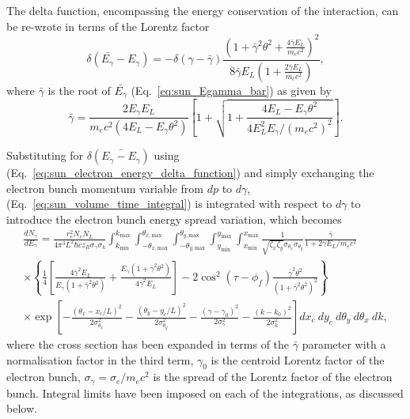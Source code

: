 \documentclass[../main.tex]{subfiles}
\begin{document}
The delta function, encompassing the energy conservation of the interaction, can be re-wrote in terms of the Lorentz factor
\begin{equation}
\delta\left(\bar{E_{\gamma}}-E_{\gamma}\right) = -\delta\left(\gamma-\bar{\gamma}\right)\frac{\left(1+\bar{\gamma}^{2}\theta^{2}+\frac{4\bar{\gamma}E_{L}}{m_{e}c^{2}}\right)^{2}}{8\bar{\gamma}E_{L}\left(1+\frac{2\bar{\gamma}E_{L}}{m_{e}c^{2}}\right)},
\label{eq:sun_electron_energy_delta_function}    
\end{equation}
where $\bar{\gamma}$ is the root of $\bar{E_{\gamma}}$ (Eq.~\ref{eq:sun_Egamma_bar}) as given by
\begin{equation}
\bar{\gamma} = \frac{2E_{\gamma}E_{L}}{m_{e}c^{2}\left(4E_{L}-E_{\gamma}\theta^{2}\right)}\left[1+\sqrt{1+\frac{4E_{L}-E_{\gamma}\theta^{2}}{4E_{L}^{2}E_{\gamma}/\left(m_{e}c^{2}\right)^{2}}}\right].    
\end{equation}

Substituting for $\delta\left(\bar{E_{\gamma}-E_{\gamma}}\right)$ using (Eq.~\ref{eq:sun_electron_energy_delta_function}) and simply exchanging the electron bunch momentum variable from $dp$ to $d\gamma$, (Eq.~\ref{eq:sun_volume_time_integral}) is integrated with respect to $d\gamma$ to introduce the electron bunch energy spread variation, which becomes
\begin{multline}
\frac{dN_{\gamma}}{dE_{\gamma}} = \frac{r_{e}^{2}N_{e}N_{L}}{4\pi^{3}L^{2}\hbar c z_{R}\sigma_{\gamma}\sigma_{k}}\int_{k_{\mathrm{min}}}^{k_{\mathrm{max}}}\int_{-\theta_{x,\mathrm{max}}}^{\theta_{x,\mathrm{max}}}\int_{-\theta_{y,\mathrm{max}}}^{\theta_{y,\mathrm{max}}}\int_{y_{\mathrm{min}}}^{y_{\mathrm{max}}}\int_{x_{\mathrm{min}}}^{x_{\mathrm{max}}}\frac{1}{\sqrt{\zeta_{x}\zeta_{y}}\sigma_{\theta_{x}}\sigma_{\theta_{y}}}\frac{\bar{\gamma}}{1+2\gamma E_{L}/m_{e}c^{2}} \\
\times\left\{\frac{1}{4}\left[\frac{4\bar{\gamma}^{2}E_{L}}{E_{\gamma}\left(1+\bar{\gamma}^{2}\theta^{2}\right)}+\frac{E_{\gamma}\left(1+\bar{\gamma}^{2}\theta^{2}\right)}{4\bar{\gamma}^{2}E_{L}}\right]-2\cos^{2}\left(\tau-\phi_{f}\right)\frac{\bar{\gamma}^{2}\theta^{2}}{\left(1+\bar{\gamma}^{2}\theta^{2}\right)^{2}}\right\} \\
\times\exp{\left[-\frac{\left(\theta_{x}-x_{c}/L\right)^{2}}{2\sigma_{\theta_{x}}^{2}}-\frac{\left(\theta_{y}-y_{c}/L\right)^{2}}{2\sigma_{\theta_{y}}^{2}}-\frac{\left(\gamma-\gamma_{0}\right)^{2}}{2\sigma_{\gamma}^{2}}-\frac{\left(k-k_{0}\right)^{2}}{2\sigma_{k}^{2}}\right]}dx_{c}~dy_{c}~d\theta_{y}~d\theta_{x}~dk,
\label{eq:ICARUS_equation}
\end{multline}
where the cross section has been expanded in terms of the $\bar{\gamma}$ parameter with a normalisation factor in the third term, $\gamma_{0}$ is the centroid Lorentz factor of the electron bunch, $\sigma_{\gamma} = \sigma_{e}/m_{e}c^{2}$ is the spread of the Lorentz factor of the electron bunch. Integral limits have been imposed on each of the integrations, as discussed below. 
\end{document}
